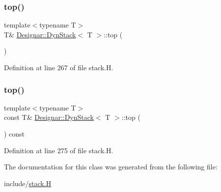 \subsubsection{\texorpdfstring{top()}{top()}\hspace{0.1cm}{\footnotesize\ttfamily [1/2]}}
{\footnotesize\ttfamily template$<$typename T$>$ \\
T\& \hyperlink{class_designar_1_1_dyn_stack}{Designar\+::\+Dyn\+Stack}$<$ T $>$\+::top (\begin{DoxyParamCaption}{ }\end{DoxyParamCaption})\hspace{0.3cm}{\ttfamily [inline]}}



Definition at line 267 of file stack.\+H.

\mbox{\label{class_designar_1_1_dyn_stack_a497eb06d2cb8280d031586a913b1317c}} 
\subsubsection{\texorpdfstring{top()}{top()}\hspace{0.1cm}{\footnotesize\ttfamily [2/2]}}
{\footnotesize\ttfamily template$<$typename T$>$ \\
const T\& \hyperlink{class_designar_1_1_dyn_stack}{Designar\+::\+Dyn\+Stack}$<$ T $>$\+::top (\begin{DoxyParamCaption}{ }\end{DoxyParamCaption}) const\hspace{0.3cm}{\ttfamily [inline]}}



Definition at line 275 of file stack.\+H.



The documentation for this class was generated from the following file\+:\begin{DoxyCompactItemize}
\item 
include/\hyperlink{stack_8_h}{stack.\+H}\end{DoxyCompactItemize}

